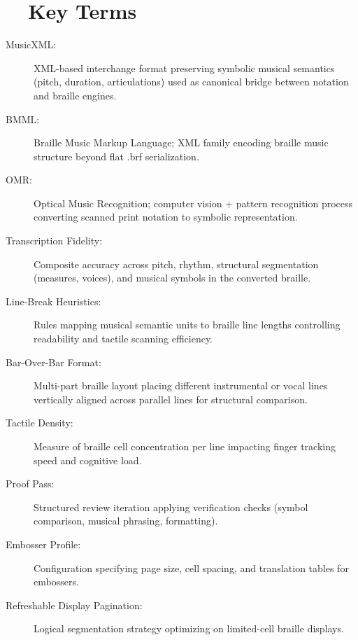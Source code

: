 \section{~~Key Terms}\label{ch10:sec:key-terms}
\begin{description}
	\item[MusicXML:] XML-based interchange format preserving symbolic musical semantics (pitch, duration, articulations) used as canonical bridge between notation and braille engines.\supercite{daisy-musicxml}
	\item[BMML:] Braille Music Markup Language; XML family encoding braille music structure beyond flat .brf serialization.\supercite{braillemuse}
	\item[OMR:] Optical Music Recognition; computer vision + pattern recognition process converting scanned print notation to symbolic representation.\supercite{researchgate-polyphonic-omr}
	\item[Transcription Fidelity:] Composite accuracy across pitch, rhythm, structural segmentation (measures, voices), and musical symbols in the converted braille.
	\item[Line-Break Heuristics:] Rules mapping musical semantic units to braille line lengths controlling readability and tactile scanning efficiency.
	\item[Bar-Over-Bar Format:] Multi-part braille layout placing different instrumental or vocal lines vertically aligned across parallel lines for structural comparison.
	\item[Tactile Density:] Measure of braille cell concentration per line impacting finger tracking speed and cognitive load.
	\item[Proof Pass:] Structured review iteration applying verification checks (symbol comparison, musical phrasing, formatting).
	\item[Embosser Profile:] Configuration specifying page size, cell spacing, and translation tables for  embossers.
	\item[Refreshable Display Pagination:] Logical segmentation strategy optimizing  on limited-cell braille displays.
\end{description}

